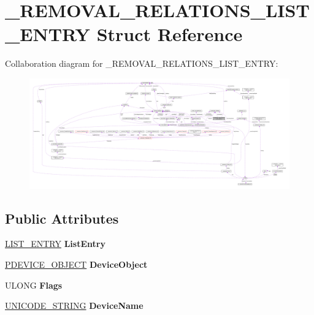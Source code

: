 \hypertarget{struct__REMOVAL__RELATIONS__LIST__ENTRY}{}\section{\+\_\+\+R\+E\+M\+O\+V\+A\+L\+\_\+\+R\+E\+L\+A\+T\+I\+O\+N\+S\+\_\+\+L\+I\+S\+T\+\_\+\+E\+N\+T\+R\+Y Struct Reference}
\label{struct__REMOVAL__RELATIONS__LIST__ENTRY}


Collaboration diagram for \+\_\+\+R\+E\+M\+O\+V\+A\+L\+\_\+\+R\+E\+L\+A\+T\+I\+O\+N\+S\+\_\+\+L\+I\+S\+T\+\_\+\+E\+N\+T\+R\+Y\+:
\nopagebreak
\begin{figure}[H]
\begin{center}
\leavevmode
\includegraphics[width=350pt]{struct__REMOVAL__RELATIONS__LIST__ENTRY__coll__graph}
\end{center}
\end{figure}
\subsection*{Public Attributes}
\begin{DoxyCompactItemize}
\item 
\hypertarget{struct__REMOVAL__RELATIONS__LIST__ENTRY_a02f829cbb3403e7a95ff446e82be41dc}{}\hyperlink{struct__LIST__ENTRY}{L\+I\+S\+T\+\_\+\+E\+N\+T\+R\+Y} {\bfseries List\+Entry}\label{struct__REMOVAL__RELATIONS__LIST__ENTRY_a02f829cbb3403e7a95ff446e82be41dc}

\item 
\hypertarget{struct__REMOVAL__RELATIONS__LIST__ENTRY_a8c2173de888ee2ad940feec24e6d9aca}{}\hyperlink{struct__DEVICE__OBJECT}{P\+D\+E\+V\+I\+C\+E\+\_\+\+O\+B\+J\+E\+C\+T} {\bfseries Device\+Object}\label{struct__REMOVAL__RELATIONS__LIST__ENTRY_a8c2173de888ee2ad940feec24e6d9aca}

\item 
\hypertarget{struct__REMOVAL__RELATIONS__LIST__ENTRY_af1e6892385c38b16ebb2889024fc846c}{}U\+L\+O\+N\+G {\bfseries Flags}\label{struct__REMOVAL__RELATIONS__LIST__ENTRY_af1e6892385c38b16ebb2889024fc846c}

\item 
\hypertarget{struct__REMOVAL__RELATIONS__LIST__ENTRY_adec8401edf165d9332c86c78586dbf97}{}\hyperlink{struct__UNICODE__STRING}{U\+N\+I\+C\+O\+D\+E\+\_\+\+S\+T\+R\+I\+N\+G} {\bfseries Device\+Name}\label{struct__REMOVAL__RELATIONS__LIST__ENTRY_adec8401edf165d9332c86c78586dbf97}

\end{DoxyCompactItemize}


